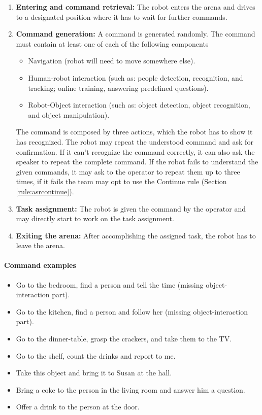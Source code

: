 \begin{enumerate}
\item \textbf{Entering and command retrieval:} The robot enters the arena and drives to a designated position where it has to wait for further commands.
\item \textbf{Command generation:} A command is generated randomly. The command must contain at least one of each of the following components
\begin{itemize}
\item Navigation (robot will need to move somewhere else).
\item Human-robot interaction (such as: people detection, recognition, and tracking; online training, answering predefined questions).
\item Robot-Object interaction (such as: object detection, object recognition, and object manipulation).
\end{itemize}
The command is composed by three actions, which the robot has to show it has recognized. The robot may repeat the understood command and ask for confirmation. If it can't recognize the command correctly, it can also ask the speaker to repeat the complete command. If the robot fails to understand the given commands, it may ask to the operator to repeat them up to three times, if it fails the team may opt to use the Continue rule (Section \ref{rule:asrcontinue}).
\item \textbf{Task assignment:} The robot is given the command by the operator and may directly start to work on the task assignment.
\item \textbf{Exiting the arena:} After accomplishing the assigned task, the robot has to leave the arena.
\end{enumerate}

\paragraph{Command examples}
\begin{itemize}
\item Go to the bedroom, find a person and tell the time (missing object-interaction part).
\item Go to the kitchen, find a person and follow her (missing object-interaction part).
\item Go to the dinner-table, grasp the crackers, and take them to the TV.
\item Go to the shelf, count the drinks and report to me.
\item Take this object and bring it to Susan at the hall.
\item Bring a coke to the person in the living room and answer him a question.
\item Offer a drink to the person at the door.
\end{itemize}

